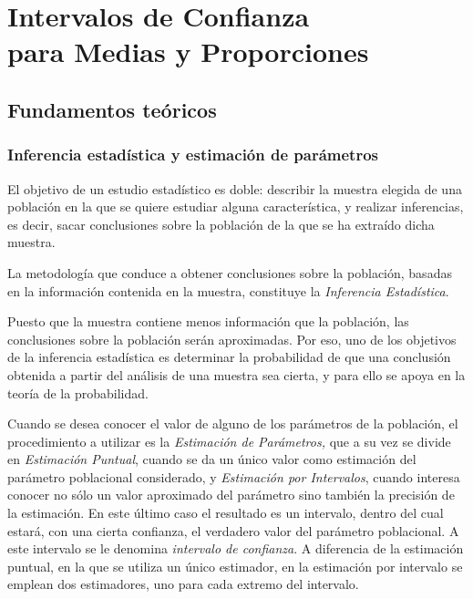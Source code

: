 
\chapter[Intervalos de Confianza para Medias y Proporciones]{Intervalos de Confianza\\ para Medias y Proporciones}

\section{Fundamentos teóricos}

\subsection{Inferencia estadística y estimación de parámetros}
El objetivo de un estudio estadístico es doble: describir la muestra elegida de una población en la que se quiere
estudiar alguna característica, y realizar inferencias, es decir, sacar conclusiones sobre la
población de la que se ha extraído dicha muestra.

La metodología que conduce a obtener conclusiones sobre la población, basadas en la información contenida en la muestra,
constituye la \emph{Inferencia Estadística}.

Puesto que la muestra contiene menos información que la población, las conclusiones sobre la población serán aproximadas. Por eso, uno de
los objetivos de la inferencia estadística es determinar la probabilidad de que una conclusión obtenida a partir del
análisis de una muestra sea cierta, y para ello se apoya en la teoría de la probabilidad.

Cuando se desea conocer el valor de alguno de los parámetros de la población, el procedimiento a utilizar es la
\emph{Estimación de Parámetros, }que a su vez se divide en \emph{Estimación Puntual}, cuando se da un único valor como
estimación del parámetro poblacional considerado, y \emph{Estimación por Intervalos}, cuando interesa conocer no sólo un
valor aproximado del parámetro sino también la precisión de la estimación. En este último caso el resultado es un
intervalo, dentro del cual estará, con una cierta confianza, el verdadero valor del parámetro poblacional. A este
intervalo se le denomina \emph{intervalo de confianza}. A diferencia de la estimación puntual, en la que se utiliza un
único estimador, en la estimación por intervalo se emplean dos estimadores, uno para cada extremo del intervalo.

